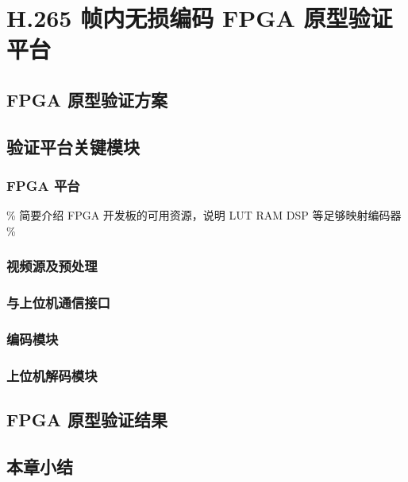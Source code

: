 \chapter{H.265 帧内无损编码 FPGA 原型验证平台}
\label{cha:c5}

\section{FPGA 原型验证方案}

\section{验证平台关键模块}
\subsection{FPGA 平台}
\% 简要介绍 FPGA 开发板的可用资源，说明 LUT RAM DSP 等足够映射编码器 \%

\subsection{视频源及预处理}

\subsection{与上位机通信接口}

\subsection{编码模块}

\subsection{上位机解码模块}

\section{FPGA 原型验证结果}

\section{本章小结}